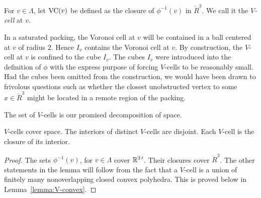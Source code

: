 %

\begin{definition}\label{def:vcell}
For $v\in\Lambda$, let ${\operatorname{VC}}(v)$ be defined as the closure of
$\phi^{-1}(v)$ in $\ring{R}^3$.  We call it the {\it $V$-cell\/}
at $v$.
%
\end{definition}


\begin{remark}
In a saturated packing, the Voronoi cell at $v$ will be contained
in a ball centered at $v$ of radius $2$.  Hence $I_v$ contains the
Voronoi cell at $v$.  By construction, the $V$-cell at $v$ is
confined to the cube $I_v$.  The cubes $I_v$ were introduced into
the definition of $\phi$ with the express purpose of forcing
$V$-cells to be reasonably small.  Had the cubes been omitted from
the construction, we would have been drawn to frivolous questions
such as whether the closest unobstructed vertex to some
$x\in\ring{R}^3$ might be located in a remote region of the
packing.
\end{remark}



The set of $V$-cells is our promised decomposition of space.

\begin{lemma} $V$-cells cover space.  The interiors of distinct
$V$-cells are disjoint.  Each $V$-cell is the closure of its
interior.
\end{lemma}

\begin{proof}  The sets $\phi^{-1}(v)$, for $v\in\Lambda$ cover
$\mathbb{R}^{3\,\prime}$.  Their closures cover $\ring{R}^3$.  The other statements in
the lemma will follow from the fact that a $V$-cell is a union of
finitely many nonoverlapping closed convex polyhedra.  This is
proved below in Lemma~\ref{lemma:V-convex}.
\end{proof}

